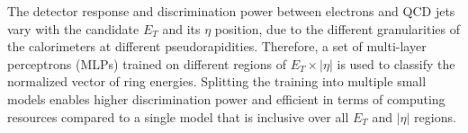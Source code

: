 The detector response and discrimination power between electrons and QCD jets vary with the candidate $E_T$ and its $\eta$ position, due to the different granularities of the calorimeters at different pseudorapidities. Therefore, a set of multi-layer perceptrons (MLPs) trained on different regions of $E_T \times |\eta|$ is used to classify the normalized vector of ring energies. 
Splitting the training into multiple small models enables higher discrimination power and efficient in terms of computing resources compared to a single model that is inclusive over all $E_T$ and $|\eta|$ regions.



